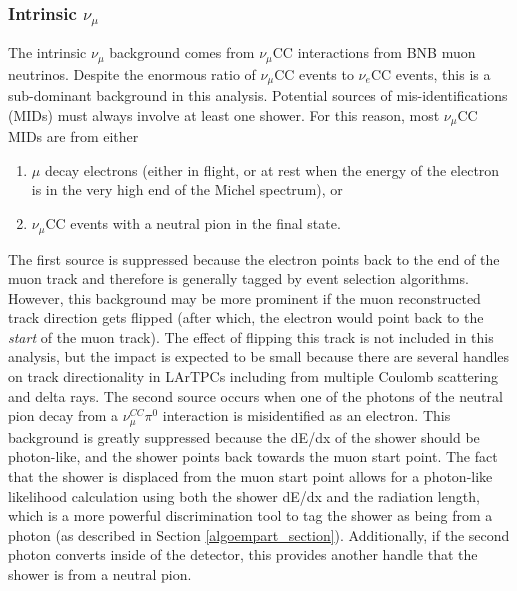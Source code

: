 \subsubsection{Intrinsic $\nu_\mu$}
The intrinsic $\nu_\mu$ background comes from $\nu_\mu$CC interactions from BNB muon neutrinos. Despite the enormous ratio of $\nu_\mu$CC events to $\nu_e$CC events, this is a sub-dominant background in this analysis. Potential sources of mis-identifications (MIDs) must always involve at least one shower. For this reason, most $\nu_\mu$CC MIDs are from either
\begin{enumerate}
\item $\mu$ decay electrons (either in flight, or at rest when the energy of the electron is in the very high end of the Michel spectrum), or 
\item $\nu_\mu$CC events with a neutral pion in the final state. 
\end{enumerate}
The first source is suppressed because the electron points back to the end of the muon track and therefore is generally tagged by event selection algorithms. However, this background may be more prominent if the muon reconstructed track direction gets flipped (after which, the electron would point back to the \textit{start} of the muon track). The effect of flipping this track is not included in this analysis, but the impact is expected to be small because there are several handles on track directionality in LArTPCs including from multiple Coulomb scattering and delta rays. The second source occurs when one of the photons of the neutral pion decay from a $\nu_\mu^{CC}\pi^0$ interaction is misidentified as an electron. This background is greatly suppressed because the dE/dx of the shower should be photon-like, and the shower points back towards the muon start point. The fact that the shower is displaced from the muon start point allows for a photon-like likelihood calculation using both the shower dE/dx and the radiation length, which is a more powerful discrimination tool to tag the shower as being from a photon (as described in Section \ref{algoempart_section}). Additionally, if the second photon converts inside of the detector, this provides another handle that the shower is from a neutral pion.

